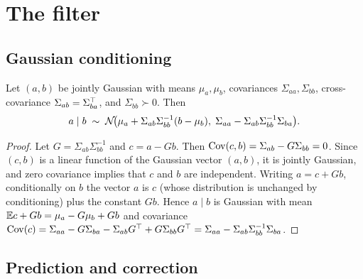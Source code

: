 \section{The filter}

\subsection{Gaussian conditioning}

\begin{lemma}\label{kf:lem:conditioning}
Let $(a,b)$ be jointly Gaussian with means $\mu_a,\mu_b$, covariances
$\Sigma_{aa},\Sigma_{bb}$, cross-covariance $\Sigma_{ab}=\Sigma_{ba}^\top$, and
$\Sigma_{bb}\succ0$. Then
\[
  a\mid b \;\sim\; \mathcal{N}\!\big(\mu_a + \Sigma_{ab}\Sigma_{bb}^{-1}(b-\mu_b),\;
                         \Sigma_{aa}-\Sigma_{ab}\Sigma_{bb}^{-1}\Sigma_{ba}\big).
\]
\end{lemma}
\begin{proof}
Let $G=\Sigma_{ab}\Sigma_{bb}^{-1}$ and $c=a-Gb$. Then
$\operatorname{Cov}(c,b)=\Sigma_{ab}-G\Sigma_{bb}=0$. Since $(c,b)$ is a linear function of
the Gaussian vector $(a,b)$, it is jointly Gaussian, and zero covariance implies
that $c$ and $b$ are independent. Writing $a=c+Gb$, conditionally on $b$ the
vector $a$ is $c$ (whose distribution is unchanged by conditioning) plus the
constant $Gb$. Hence $a\mid b$ is Gaussian with mean
$\mathbb{E} c+Gb=\mu_a-G\mu_b+Gb$ and covariance
$\operatorname{Cov}(c)=\Sigma_{aa}-G\Sigma_{ba}-\Sigma_{ab}G^\top+G\Sigma_{bb}G^\top=\Sigma_{aa}-\Sigma_{ab}\Sigma_{bb}^{-1}\Sigma_{ba}$.
\end{proof}

\subsection{Prediction and correction}

